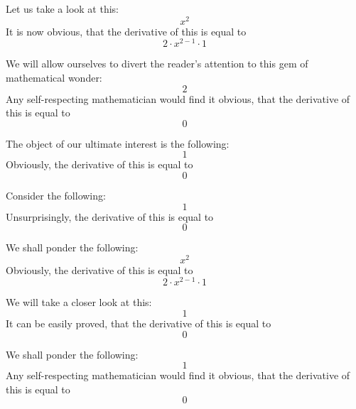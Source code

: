 \documentclass{article}
\begin{document}
Let us take a look at this:
\begin{equation}
x ^{2 } 
\end{equation}
It is now obvious, that the derivative of this is equal to
\begin{equation}
2 \cdot x ^{2 - 1 } \cdot 1 
\end{equation}

We will allow ourselves to divert the reader's attention to this gem of mathematical wonder:
\begin{equation}
2 
\end{equation}
Any self-respecting mathematician would find it obvious, that the derivative of this is equal to
\begin{equation}
0 
\end{equation}

The object of our ultimate interest is the following:
\begin{equation}
1 
\end{equation}
Obviously, the derivative of this is equal to
\begin{equation}
0 
\end{equation}

Consider the following:
\begin{equation}
1 
\end{equation}
Unsurprisingly, the derivative of this is equal to
\begin{equation}
0 
\end{equation}

We shall ponder the following:
\begin{equation}
x ^{2 } 
\end{equation}
Obviously, the derivative of this is equal to
\begin{equation}
2 \cdot x ^{2 - 1 } \cdot 1 
\end{equation}

We will take a closer look at this:
\begin{equation}
1 
\end{equation}
It can be easily proved, that the derivative of this is equal to
\begin{equation}
0 
\end{equation}

We shall ponder the following:
\begin{equation}
1 
\end{equation}
Any self-respecting mathematician would find it obvious, that the derivative of this is equal to
\begin{equation}
0 
\end{equation}
\end{document}
